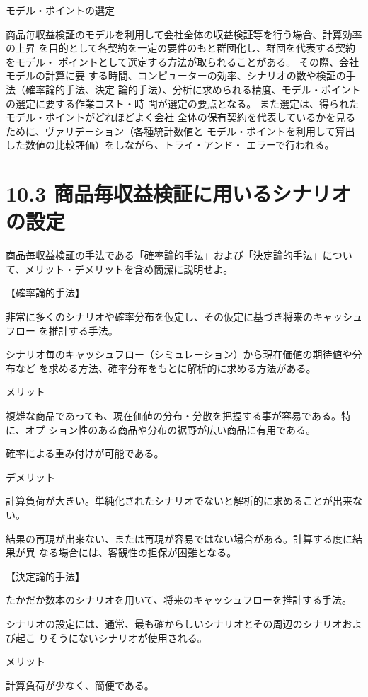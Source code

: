 \documentclass[report,gutter=10mm,fore-edge=10mm,uplatex,dvipdfmx]{jlreq}
\begin{document}
 モデル・ポイントの選定

商品毎収益検証のモデルを利用して会社全体の収益検証等を行う場合、計算効率の上昇
を目的として各契約を一定の要件のもと群団化し、群団を代表する契約をモデル・
ポイントとして選定する方法が取られることがある。
その際、会社モデルの計算に要
する時間、コンピューターの効率、シナリオの数や検証の手法（確率論的手法、決定
論的手法）、分析に求められる精度、モデル・ポイントの選定に要する作業コスト・時
間が選定の要点となる。
また選定は、得られたモデル・ポイントがどれほどよく会社
全体の保有契約を代表しているかを見るために、ヴァリデーション（各種統計数値と
モデル・ポイントを利用して算出した数値の比較評価）をしながら、トライ・アンド・
エラーで行われる。

\section{10.3 商品毎収益検証に用いるシナリオの設定}
商品毎収益検証の手法である「確率論的手法」および「決定論的手法」について、メリット・デメリットを含め簡潔に説明せよ。

\answer{}

【確率論的手法】

非常に多くのシナリオや確率分布を仮定し、その仮定に基づき将来のキャッシュフロー
を推計する手法。

シナリオ毎のキャッシュフロー（シミュレーション）から現在価値の期待値や分布など
を求める方法、確率分布をもとに解析的に求める方法がある。

メリット

複雑な商品であっても、現在価値の分布・分散を把握する事が容易である。特に、オプ
ション性のある商品や分布の裾野が広い商品に有用である。

確率による重み付けが可能である。

デメリット

計算負荷が大きい。単純化されたシナリオでないと解析的に求めることが出来ない。

結果の再現が出来ない、または再現が容易ではない場合がある。計算する度に結果が異
なる場合には、客観性の担保が困難となる。

【決定論的手法】

たかだか数本のシナリオを用いて、将来のキャッシュフローを推計する手法。

シナリオの設定には、通常、最も確からしいシナリオとその周辺のシナリオおよび起こ
りそうにないシナリオが使用される。

メリット

計算負荷が少なく、簡便である。
\end{document}
